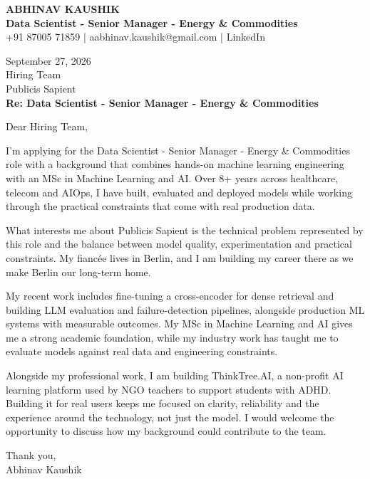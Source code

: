 \documentclass[10pt,a4paper]{article}
\begin{document}
\begin{center}
{\Large\bfseries ABHINAV KAUSHIK}\\[2pt]
{\bfseries Data Scientist - Senior Manager - Energy \& Commodities}\\[2pt]
+91 87005 71859 \quad | \quad aabhinav.kaushik@gmail.com \quad | \quad LinkedIn
\end{center}
\vspace{8pt}
September 27, 2026\\[6pt]
Hiring Team\\
Publicis Sapient\\[4pt]
\textbf{Re: Data Scientist - Senior Manager - Energy \& Commodities}

Dear Hiring Team,

I’m applying for the Data Scientist - Senior Manager - Energy \& Commodities role with a background that combines hands-on machine learning engineering with an MSc in Machine Learning and AI. Over 8+ years across healthcare, telecom and AIOps, I have built, evaluated and deployed models while working through the practical constraints that come with real production data.

What interests me about Publicis Sapient is the technical problem represented by this role and the balance between model quality, experimentation and practical constraints. My fiancée lives in Berlin, and I am building my career there as we make Berlin our long-term home.

My recent work includes fine-tuning a cross-encoder for dense retrieval and building LLM evaluation and failure-detection pipelines, alongside production ML systems with measurable outcomes. My MSc in Machine Learning and AI gives me a strong academic foundation, while my industry work has taught me to evaluate models against real data and engineering constraints.

Alongside my professional work, I am building ThinkTree.AI, a non-profit AI learning platform used by NGO teachers to support students with ADHD. Building it for real users keeps me focused on clarity, reliability and the experience around the technology, not just the model. I would welcome the opportunity to discuss how my background could contribute to the team.

Thank you,\\
Abhinav Kaushik
\end{document}
